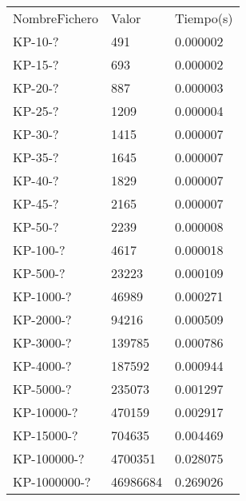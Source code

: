 \documentclass[preprint]{elsarticle}
\begin{document}
\begin{table}[h]
\begin{tabular}{lll}
NombreFichero & Valor & Tiempo(s)\\
KP-10-? & 491 & 0.000002\\
KP-15-? & 693 & 0.000002\\
KP-20-? & 887 & 0.000003\\
KP-25-? & 1209 & 0.000004\\
KP-30-? & 1415 & 0.000007\\
KP-35-? & 1645 & 0.000007\\
KP-40-? & 1829 & 0.000007\\
KP-45-? & 2165 & 0.000007\\
KP-50-? & 2239 & 0.000008\\
KP-100-? & 4617 & 0.000018\\
KP-500-? & 23223 & 0.000109\\ 
KP-1000-? & 46989 & 0.000271\\
KP-2000-? & 94216 & 0.000509\\ 
KP-3000-? & 139785 & 0.000786\\
KP-4000-? & 187592 & 0.000944\\
KP-5000-? & 235073 & 0.001297\\
KP-10000-? & 470159 & 0.002917\\
KP-15000-? & 704635 & 0.004469\\
KP-100000-? & 4700351 & 0.028075\\
KP-1000000-? & 46986684 & 0.269026
\end{tabular}
\end{table}

\pagebreak
\end{document}
